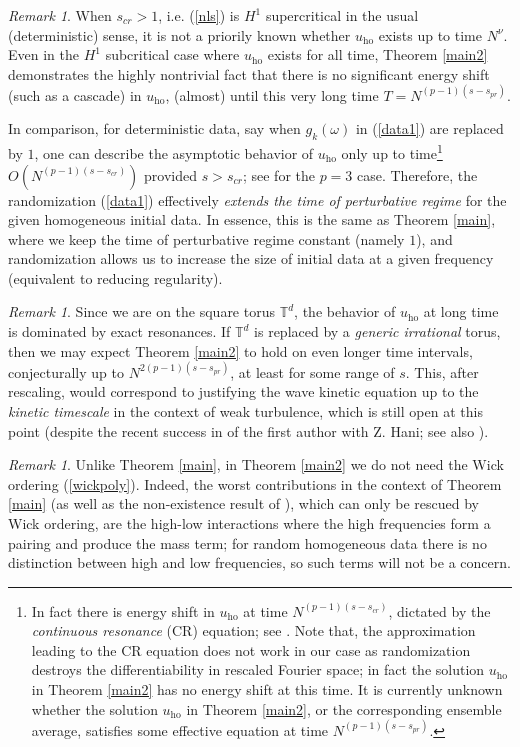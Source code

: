 \documentclass[11 pt,reqno]{amsart}
\theoremstyle{definition}
\theoremstyle{remark}
\newtheorem{rem}[thm]{Remark}
\numberwithin{equation}{section}
\newcommand{\Tb}{\mathbb{T}}
\begin{document}
\begin{rem} When $s_{cr}>1$, i.e. (\ref{nls}) is $H^1$ supercritical in the usual (deterministic) sense, it is not a priorily known whether $u_{\mathrm{ho}}$ exists up to time $N^\nu$. Even in the $H^1$ subcritical case where $u_{\mathrm{ho}}$ exists for all time, Theorem \ref{main2} demonstrates the highly nontrivial fact that there is no significant energy shift (such as a cascade) in $u_{\mathrm{ho}}$, (almost) until this very long time $T=N^{(p-1)(s-s_{pr})}$.

In comparison, for deterministic data, say when $g_k(\omega)$ in (\ref{data1}) are replaced by $1$, one can describe the asymptotic behavior of $u_{\mathrm{ho}}$ only up to time\footnote{In fact there is energy shift in $u_{\mathrm{ho}}$ at time $N^{(p-1)(s-s_{cr})}$, dictated by the \emph{continuous resonance} (CR) equation; see \cite{BGHS0,FGH}. Note that, the approximation leading to the CR equation does not work in our case as randomization destroys the differentiability in rescaled Fourier space; in fact the solution $u_{\mathrm{ho}}$ in Theorem \ref{main2} has no energy shift at this time. It is currently unknown whether the solution $u_{\mathrm{ho}}$ in Theorem \ref{main2}, or the corresponding ensemble average, satisfies some effective equation at time $N^{(p-1)(s-s_{pr})}$.} $O(N^{(p-1)(s-s_{cr})})$ provided $s>s_{cr}$; see \cite{BGHS0,FGH} for the $p=3$ case. Therefore, the randomization (\ref{data1}) effectively \emph{extends the time of perturbative regime} for the given homogeneous initial data. In essence, this is the same as Theorem \ref{main}, where we keep the time of perturbative regime constant (namely $1$), and randomization allows us to increase the size of initial data at a given frequency (equivalent to reducing regularity).
\end{rem}
\begin{rem} Since we are on the square torus $\Tb^d$, the behavior of $u_{\mathrm{ho}}$ at long time is dominated by exact resonances. If $\Tb^d$ is replaced by a \emph{generic irrational} torus, then we may expect Theorem \ref{main2} to hold on even longer time intervals, conjecturally up to $N^{2(p-1)(s-s_{pr})}$, at least for some range of $s$. This, after rescaling, would correspond to justifying the wave kinetic equation up to the \emph{kinetic timescale} in the context of weak turbulence, which is still open at this point (despite the recent success in \cite{DH} of the first author with Z. Hani; see also \cite{CG}).
\end{rem}
\begin{rem} Unlike Theorem \ref{main}, in Theorem \ref{main2} we do not need the Wick ordering (\ref{wickpoly}). Indeed, the worst contributions in the context of Theorem \ref{main} (as well as the non-existence result of \cite{GO}), which can only be rescued by Wick ordering, are the high-low interactions where the high frequencies form a pairing and produce the mass term; for random homogeneous data there is no distinction between high and low frequencies, so such terms will not be a concern.
\end{rem}
\end{document}
